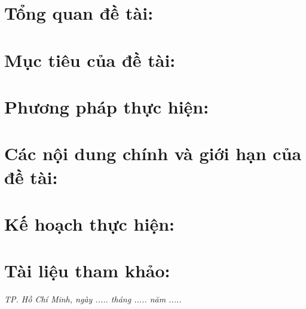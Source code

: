 \documentclass{template/v1}
\begin{document}
\printinfo

\vspace*{3ex}

\section{Tổng quan đề tài:}
\label{sec:tong-quan-de-tai}


\section{Mục tiêu của đề tài:}
\label{sec:muc-tieu-de-tai}


\section{Phương pháp thực hiện:}
\label{sec:phung-phap-thuc-hien}


\section{Các nội dung chính và giới hạn của đề tài:}
\label{sec:noi-dung}


\section{Kế hoạch thực hiện:}
\label{sec:ke-hoach}


\section{Tài liệu tham khảo:}
\nocite{*}
\justifying\printbibliography[heading=none]

\hfill\textit{TP. Hồ Chí Minh, ngày ..... tháng ..... năm .....}
\nopagebreak\printsignature
\end{document}
